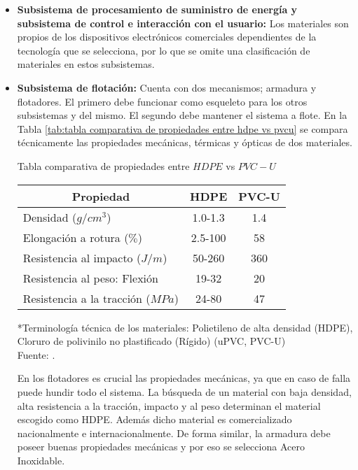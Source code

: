\begin{itemize}
	\item \textbf{Subsistema de procesamiento de suministro de energía y subsistema de control e interacción con el usuario:} Los materiales son propios de los dispositivos electrónicos comerciales dependientes de la tecnología que se selecciona, por lo que se omite una clasificación de materiales en estos subsistemas.
	
	
	\item \textbf{Subsistema de flotación:} Cuenta con dos mecanismos; armadura y flotadores. El primero debe funcionar como esqueleto para los otros subsistemas y del mismo. El segundo debe mantener el sistema a flote. En la Tabla \ref{tab:tabla comparativa de propiedades entre hdpe vs pvcu} se compara técnicamente las propiedades mecánicas, térmicas y ópticas de dos materiales.
	
	\begin{mytable}[H]
		\footnotesize\centering
		\caption{Tabla comparativa de propiedades entre $HDPE$ vs $PVC-U$}
		\label{tab:tabla comparativa de propiedades entre hdpe vs pvcu}
		\begin{tabular}{|l|c|c|}
			\hline
			\multicolumn{1}{|c|}{\textbf{Propiedad}} & \textbf{HDPE} & \textbf{PVC-U} \\ \hline
			Densidad ($g/cm^3$) & 1.0-1.3 & 1.4 \\ \hline
			Elongación a rotura ($\%$) & 2.5-100 & 58 \\ \hline
			Resistencia al impacto ($J/m$) & 50-260 & 360 \\ \hline
			Resistencia al peso: Flexión & 19-32 & 20 \\ \hline
			Resistencia a la tracción ($MPa$) & 24-80 & 47 \\ \hline
		\end{tabular}
		\begin{myflushcenteraftertable}
			*Terminología técnica de los materiales: Polietileno de alta densidad (HDPE), Cloruro de polivinilo no plastificado (Rígido) (uPVC, PVC-U)\\		
			Fuente: \cite{Brydson1999,Berins1991,Harper2000,MakeItFrom2020}.
		\end{myflushcenteraftertable}
	\end{mytable}
	
	En los flotadores es crucial las propiedades mecánicas, ya que en caso de falla puede hundir todo el sistema. La búsqueda de un material con baja densidad, alta resistencia a la tracción, impacto y al peso determinan el material escogido como HDPE. Además dicho material es comercializado nacionalmente e internacionalmente. De forma similar, la armadura debe poseer buenas propiedades mecánicas y por eso se selecciona Acero Inoxidable.
	
\end{itemize}

